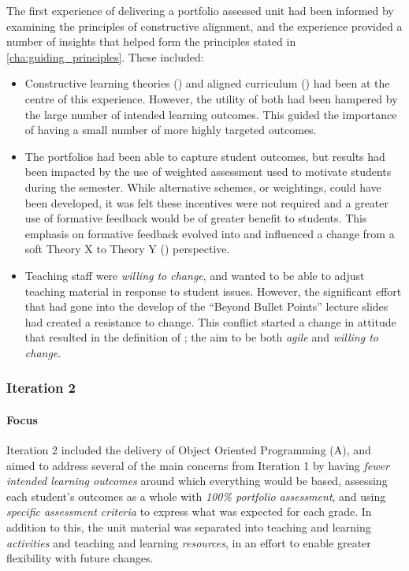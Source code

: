 The first experience of delivering a portfolio assessed unit had been informed by examining the principles of constructive alignment, and the experience provided a number of insights that helped form the principles stated in \cref{cha:guiding_principles}. These included:

\begin{itemize}[noitemsep,nolistsep]
	\item Constructive learning theories () and aligned curriculum () had been at the centre of this experience. However, the utility of both had been hampered by the large number of intended learning outcomes. This guided the importance of having a small number of more highly targeted outcomes.
	\item The portfolios had been able to capture student outcomes, but results had been impacted by the use of weighted assessment used to motivate students during the semester. While alternative schemes, or weightings, could have been developed, it was felt these incentives were not required and a greater use of formative feedback would be of greater benefit to students. This emphasis on formative feedback evolved into  and influenced a change from a soft Theory X to Theory Y () perspective.
	\item Teaching staff were \emph{willing to change}, and wanted to be able to adjust teaching material in response to student issues. However, the significant effort that had gone into the develop of the ``Beyond Bullet Points'' lecture slides had created a resistance to change. This conflict started a change in attitude that resulted in the definition of ; the aim to be both \emph{agile} and \emph{willing to change}.
\end{itemize}



\subsubsection{Iteration 2} %
\label{sub:iteration_2}

\paragraph{Focus} %

Iteration 2 included the delivery of Object Oriented Programming (A), and aimed to address several of the main concerns from Iteration 1 by having \emph{fewer intended learning outcomes} around which everything would be based, assessing each student's outcomes as a whole with \emph{100\% portfolio assessment}, and using \emph{specific assessment criteria} to express what was expected for each grade. In addition to this, the unit material was separated into teaching and learning \emph{activities} and teaching and learning \emph{resources}, in an effort to enable greater flexibility with future changes.

